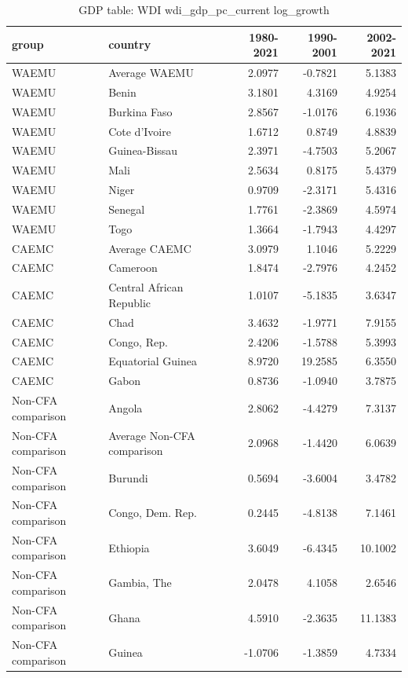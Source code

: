\begin{table}

\caption{GDP table: WDI wdi_gdp_pc_current log_growth}
\centering
\begin{tabular}[t]{llrrr}
\toprule
group & country & 1980-2021 & 1990-2001 & 2002-2021\\
\midrule
WAEMU & Average WAEMU & 2.0977 & -0.7821 & 5.1383\\
WAEMU & Benin & 3.1801 & 4.3169 & 4.9254\\
WAEMU & Burkina Faso & 2.8567 & -1.0176 & 6.1936\\
WAEMU & Cote d'Ivoire & 1.6712 & 0.8749 & 4.8839\\
WAEMU & Guinea-Bissau & 2.3971 & -4.7503 & 5.2067\\
\addlinespace
WAEMU & Mali & 2.5634 & 0.8175 & 5.4379\\
WAEMU & Niger & 0.9709 & -2.3171 & 5.4316\\
WAEMU & Senegal & 1.7761 & -2.3869 & 4.5974\\
WAEMU & Togo & 1.3664 & -1.7943 & 4.4297\\
CAEMC & Average CAEMC & 3.0979 & 1.1046 & 5.2229\\
\addlinespace
CAEMC & Cameroon & 1.8474 & -2.7976 & 4.2452\\
CAEMC & Central African Republic & 1.0107 & -5.1835 & 3.6347\\
CAEMC & Chad & 3.4632 & -1.9771 & 7.9155\\
CAEMC & Congo, Rep. & 2.4206 & -1.5788 & 5.3993\\
CAEMC & Equatorial Guinea & 8.9720 & 19.2585 & 6.3550\\
\addlinespace
CAEMC & Gabon & 0.8736 & -1.0940 & 3.7875\\
Non-CFA comparison & Angola & 2.8062 & -4.4279 & 7.3137\\
Non-CFA comparison & Average Non-CFA comparison & 2.0968 & -1.4420 & 6.0639\\
Non-CFA comparison & Burundi & 0.5694 & -3.6004 & 3.4782\\
Non-CFA comparison & Congo, Dem. Rep. & 0.2445 & -4.8138 & 7.1461\\
\addlinespace
Non-CFA comparison & Ethiopia & 3.6049 & -6.4345 & 10.1002\\
Non-CFA comparison & Gambia, The & 2.0478 & 4.1058 & 2.6546\\
Non-CFA comparison & Ghana & 4.5910 & -2.3635 & 11.1383\\
Non-CFA comparison & Guinea & -1.0706 & -1.3859 & 4.7334\\

\end{tabular}
\end{table}
